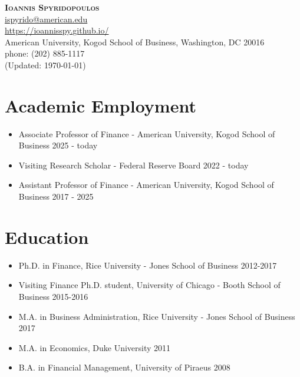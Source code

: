 \documentclass{article}[12]
\makeatletter
\newcommand{\email}[1]{\href{mailto:#1}{#1}}
\newcommand{\myname}{Ioannis Spyridopoulos}
\newcommand{\myemail}{ispyrido@american.edu}
\newcommand{\mywebsite}{https://ioannisspy.github.io/}
\newcommand{\myphone}{phone: (202) 885-1117}
\newcommand{\myaddress}{American University, Kogod School of Business, Washington, DC 20016}
\newcommand{\updated}{(Updated: \mydate\today)}
\makeatother
\begin{document}
\thispagestyle{empty}

\begin{center}
{\bfseries\Large\scshape \myname} \\[4pt]
\email{\myemail} \\ \url{\mywebsite} \\ \myaddress \\ \myphone \\ \smallskip \updated
\end{center}

\vspace{-0.5cm}

\section{Academic Employment}

\begin{itemize}[itemsep=0.25em]
    \item Associate Professor of Finance - American University, Kogod School of Business \hfill 2025 - today
    \item Visiting Research Scholar - Federal Reserve Board \hfill 2022 - today
    \item Assistant Professor of Finance - American University, Kogod School of Business \hfill 2017 - 2025
\end{itemize}

\vspace{-0.5cm}

\section{Education}

\begin{itemize}[itemsep=0.25em]
    \item Ph.D. in Finance, Rice University - Jones School of Business \hfill 2012-2017
    \item Visiting Finance Ph.D. student, University of Chicago - Booth School of Business \hfill 2015-2016
    \item M.A. in Business Administration, Rice University - Jones School of Business \hfill 2017
    \item M.A. in Economics, Duke University \hfill 2011
    \item B.A. in Financial Management, University of Piraeus \hfill 2008
\end{itemize}
\end{document}
